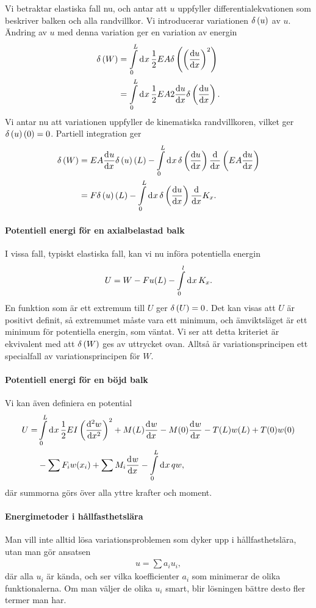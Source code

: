 Vi betraktar elastiska fall nu, och antar att $u$ uppfyller differentialekvationen som beskriver balken och alla randvillkor. Vi introducerar variationen $\delta \left(u\right)$ av $u$. Ändring av $u$ med denna variation ger en variation av energin
\begin{align*}
	\delta \left(W\right) &= \int\limits_{0}^{L}\dd[]{x}\frac{1}{2}EA\delta \left(\left(\dv{u}{x}\right)^{2}\right) \\
	        &= \int\limits_{0}^{L}\dd[]{x}\frac{1}{2}EA2\dv{u}{x}\delta \left(\dv{u}{x}\right).
\end{align*}
Vi antar nu att variationen uppfyller de kinematiska randvillkoren, vilket ger $\delta \left(u\right)(0) = 0$. Partiell integration ger
\begin{align*}
	\delta \left(W\right) &= EA\dv[]{u}{x} (L)\delta \left(u\right)(L) - \int\limits_{0}^{L}\dd[]{x}\delta \left(\dv{u}{x}\right)\dv{x}\left(EA\dv{u}{x}\right) \\
	        &= F\delta \left(u\right)(L) - \int\limits_{0}^{L}\dd[]{x}\delta \left(\dv{u}{x}\right)\dv{x}K_{x}.
\end{align*}

\paragraph{Potentiell energi för en axialbelastad balk}
I vissa fall, typiskt elastiska fall, kan vi nu införa potentiella energin
\begin{align*}
	U = W - Fu(L) - \int\limits_{0}^{l}\dd[]{x}K_{x}.
\end{align*}
En funktion som är ett extremum till $U$ ger $\delta \left(U\right) = 0$. Det kan visas att $U$ är positivt definit, så extremumet måste vara ett minimum, och ämviktsläget är ett minimum för potentiella energin, som väntat. Vi ser att detta kriteriet är ekvivalent med att $\delta \left(W\right)$ ges av uttrycket ovan. Alltså är variationsprincipen ett specialfall av variationsprincipen för $W$.

\paragraph{Potentiell energi för en böjd balk}
Vi kan även definiera en potential
\begin{align*}
	U =& \int\limits_{0}^{L}\dd[]{x}\frac{1}{2}EI\left(\dv[2]{w}{x}\right)^{2} + M(L)\dv[]{w}{x} (L) - M(0)\dv[]{w}{x} (0) - T(L)w(L) + T(0)w(0)\\
	   &- \sum F_{i}w(x_{i}) + \sum M_{i}\dv[]{w}{x} (x_{i}) - \int\limits_{0}^{L}\dd[]{x}qw,
\end{align*}
där summorna görs över alla yttre krafter och moment.

\paragraph{Energimetoder i hållfasthetslära}
Man vill inte alltid lösa variationsproblemen som dyker upp i hållfasthetslära, utan man gör ansatsen
\begin{align*}
	u = \sum a_{i}u_{i},
\end{align*}
där alla $u_{i}$ är kända, och ser vilka koefficienter $a_{i}$ som minimerar de olika funktionalerna. Om man väljer de olika $u_{i}$ smart, blir lösningen bättre desto fler termer man har.